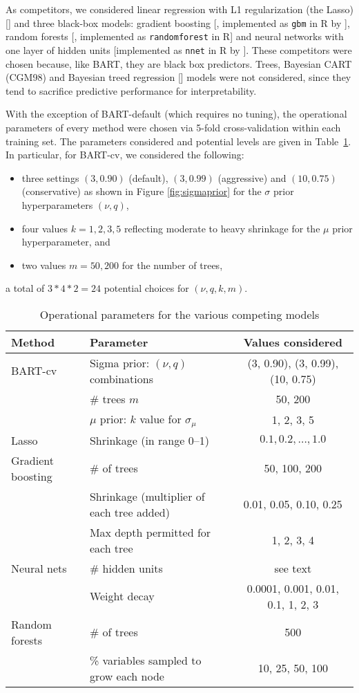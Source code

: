 \documentclass[aoas,nameyear,dvips]{arximspdf}
\newcommand{\citeasnoun}[1]{\citet{#1}}
\begin{document}
As competitors, we considered linear regression with L1 regularization
(the Lasso) [\citet{EfrHasJohTib2004}] and three black-box models:
gradient boosting [\citet{Fri2001}, implemented as \texttt{gbm} in
R by \citeasnoun{Rid2004}], random forests [\citet{Bre2001},
implemented as \texttt{randomforest} in R] and neural networks with one
layer of hidden units [implemented as \texttt{nnet} in R by
\citeasnoun{VenaRipl2002}]. These competitors were chosen because, like
BART, they are black box predictors. Trees, Bayesian CART (CGM98) and
Bayesian treed regression [\citet{ChipGeorMcCu2002a}] models were not
considered, since they tend to sacrifice predictive performance for
interpretability.

With the exception of BART-default (which requires no tuning),
the operational parameters
of every method were chosen via 5-fold cross-validation
within each training set.  The parameters considered and potential
levels are given in Table~\ref{tab:parameters}.   In particular, for BART-cv, we
considered the following:
\begin{itemize}
\item three settings $(3,0.90)$ (default), $(3,0.99)$ (aggressive) and
$(10,0.75)$ (conservative) as shown in Figure \ref{fig:sigmaprior}
for the $\sigma$ prior hyperparameters  $(\nu, q)$,
\item four values $k= 1,2,3,5$ reflecting moderate to heavy shrinkage for the $\mu$ prior hyperparameter, and
\item two values $m = 50, 200$ for the number of trees,
\end{itemize}
a total of $3*4*2 = 24$ potential choices for $(\nu, q, k, m)$.

\begin{table}[b]
\caption{Operational parameters for the various competing models}\label{tab:parameters}
\begin{tabular*}{\textwidth}{@{\extracolsep{\fill}}llc@{}}
\hline
 \textbf{Method} & \textbf{Parameter} & \textbf{Values considered} \\
 \hline
 BART-cv & Sigma prior: $(\nu, q)$
combinations & (3, 0.90), (3, 0.99), (10, 0.75)\\
& \# trees $m$ & 50, 200 \\
     & $\mu$ prior:  $k$ value for $\sigma_\mu$
          &  1, 2, 3, 5\\[3pt]
Lasso & Shrinkage (in range 0--1) & $0.1, 0.2, \ldots, 1.0$ \\[3pt]
Gradient boosting  & \# of trees & 50, 100, 200 \\
 & Shrinkage (multiplier of each tree added)& 0.01, 0.05, 0.10, 0.25 \\
         & Max depth permitted for each tree & 1, 2, 3, 4 \\[3pt]
Neural nets & \# hidden units &  see text \\
   & Weight decay & 0.0001, 0.001, 0.01, 0.1, 1, 2, 3\\[3pt] Random  forests    & \# of trees &   500 \\
    & \% variables sampled to grow each node &  10, 25, 50, 100\\
\hline
\end{tabular*}
\end{table}
\end{document}
